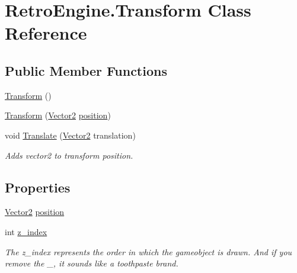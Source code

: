 \hypertarget{class_retro_engine_1_1_transform}{}\section{Retro\+Engine.\+Transform Class Reference}
\label{class_retro_engine_1_1_transform}
\subsection*{Public Member Functions}
\begin{DoxyCompactItemize}
\item 
\mbox{\hyperlink{class_retro_engine_1_1_transform_a8ed9211c1a5c4210c99bc8cc9df46b16}{Transform}} ()
\item 
\mbox{\hyperlink{class_retro_engine_1_1_transform_ac290a3caf18a57bf5504c00470a1dbab}{Transform}} (\mbox{\hyperlink{struct_retro_engine_1_1_vector2}{Vector2}} \mbox{\hyperlink{class_retro_engine_1_1_transform_ad0bee31ec3e08d642ca8c140f088a09f}{position}})
\item 
void \mbox{\hyperlink{class_retro_engine_1_1_transform_ad608f74227fbc6618cbc4395d3642f88}{Translate}} (\mbox{\hyperlink{struct_retro_engine_1_1_vector2}{Vector2}} translation)
\begin{DoxyCompactList}\small\item\em \textquotesingle{}Adds\textquotesingle{} vector2 to transform position. \end{DoxyCompactList}\end{DoxyCompactItemize}
\subsection*{Properties}
\begin{DoxyCompactItemize}
\item 
\mbox{\hyperlink{struct_retro_engine_1_1_vector2}{Vector2}} \mbox{\hyperlink{class_retro_engine_1_1_transform_ad0bee31ec3e08d642ca8c140f088a09f}{position}}
\item 
int \mbox{\hyperlink{class_retro_engine_1_1_transform_ab9648923b6e3eb8a7a30204ceb40f959}{z\+\_\+index}}
\begin{DoxyCompactList}\small\item\em The z\+\_\+index represents the order in which the gameobject is drawn. And if you remove the \textquotesingle{}\+\_\+\textquotesingle{}, it sounds like a toothpaste brand. \end{DoxyCompactList}\end{DoxyCompactItemize}


